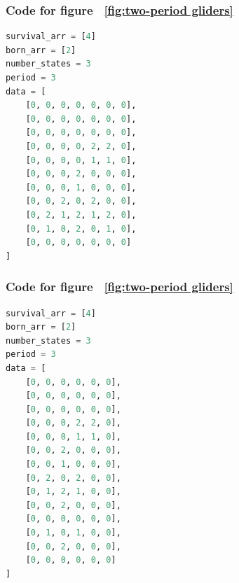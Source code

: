 \documentclass[12pt]{article}
\numberwithin{figure}{section} %
\begin{document}
\noindent\begin{minipage}{.45\textwidth}
\subsubsection{Code for figure ~\ref{fig:two-period gliders}}
\label{subsubsection:two-period gliders(4/5)}
\begin{lstlisting}[language = Python]
survival_arr = [4]
born_arr = [2]
number_states = 3
period = 3
data = [
    [0, 0, 0, 0, 0, 0, 0],
    [0, 0, 0, 0, 0, 0, 0],
    [0, 0, 0, 0, 0, 0, 0],
    [0, 0, 0, 0, 2, 2, 0],
    [0, 0, 0, 0, 1, 1, 0],
    [0, 0, 0, 2, 0, 0, 0],
    [0, 0, 0, 1, 0, 0, 0],
    [0, 0, 2, 0, 2, 0, 0],
    [0, 2, 1, 2, 1, 2, 0],
    [0, 1, 0, 2, 0, 1, 0],
    [0, 0, 0, 0, 0, 0, 0]
]
\end{lstlisting}
\end{minipage}\hfill
\begin{minipage}{.45\textwidth}
\subsubsection{Code for figure ~\ref{fig:two-period gliders}}
\label{subsubsection:two-period gliders(5/5)}
\begin{lstlisting}[language = Python]
survival_arr = [4]
born_arr = [2]
number_states = 3
period = 3
data = [
    [0, 0, 0, 0, 0, 0],
    [0, 0, 0, 0, 0, 0],
    [0, 0, 0, 0, 0, 0],
    [0, 0, 0, 2, 2, 0],
    [0, 0, 0, 1, 1, 0],
    [0, 0, 2, 0, 0, 0],
    [0, 0, 1, 0, 0, 0],
    [0, 2, 0, 2, 0, 0],
    [0, 1, 2, 1, 0, 0],
    [0, 0, 2, 0, 0, 0],
    [0, 0, 0, 0, 0, 0],
    [0, 1, 0, 1, 0, 0],
    [0, 0, 2, 0, 0, 0],
    [0, 0, 0, 0, 0, 0]
]
\end{lstlisting}
\end{minipage}
\end{document}
